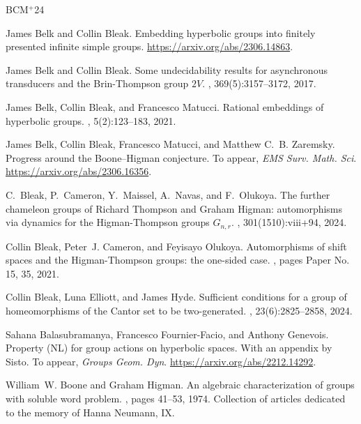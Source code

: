\documentclass[11pt,letterpaper]{amsart}
\theoremstyle{definition}
\begin{document}

\newcommand{\etalchar}[1]{$^{#1}$}
\begin{thebibliography}{BCM{\etalchar{+}}24}

James Belk and Collin Bleak.
\newblock Embedding hyperbolic groups into finitely presented infinite simple
  groups.
\newblock \url{https://arxiv.org/abs/2306.14863}.

James Belk and Collin Bleak.
\newblock Some undecidability results for asynchronous transducers and the
  {B}rin-{T}hompson group {$2V$}.
, 369(5):3157--3172, 2017.

James Belk, Collin Bleak, and Francesco Matucci.
\newblock Rational embeddings of hyperbolic groups.
, 5(2):123--183, 2021.

James Belk, Collin Bleak, Francesco Matucci, and Matthew C.~B. Zaremsky.
\newblock Progress around the {B}oone--{H}igman conjecture.
\newblock To appear, \emph{EMS Surv. Math. Sci}.
  \url{https://arxiv.org/abs/2306.16356}.

\bibitem[BCM{\etalchar{+}}24]{BCMNO}
C.~Bleak, P.~Cameron, Y.~Maissel, A.~Navas, and F.~Olukoya.
\newblock The further chameleon groups of {R}ichard {T}hompson and {G}raham
  {H}igman: automorphisms via dynamics for the {H}igman-{T}hompson groups
  {$G_{n,r}$}.
, 301(1510):viii+94, 2024.

Collin Bleak, Peter~J. Cameron, and Feyisayo Olukoya.
\newblock Automorphisms of shift spaces and the {H}igman-{T}hompson groups: the
  one-sided case.
, pages Paper No. 15, 35, 2021.

Collin Bleak, Luna Elliott, and James Hyde.
\newblock Sufficient conditions for a group of homeomorphisms of the {C}antor
  set to be two-generated.
, 23(6):2825--2858, 2024.

Sahana Balasubramanya, Francesco Fournier-Facio, and Anthony Genevois.
\newblock Property {(NL)} for group actions on hyperbolic spaces.
\newblock With an appendix by Sisto. To appear, \textit{Groups Geom. Dyn}.
  \url{https://arxiv.org/abs/2212.14292}.

William~W. Boone and Graham Higman.
\newblock An algebraic characterization of groups with soluble word problem.
, pages 41--53, 1974.
\newblock Collection of articles dedicated to the memory of Hanna Neumann, IX.


\end{thebibliography}
\end{document}
